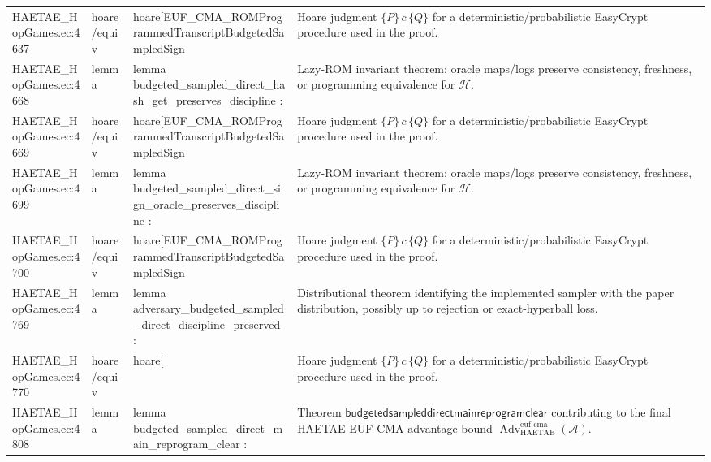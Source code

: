 \documentclass[10pt]{article}
\newcommand{\Adv}{\operatorname{Adv}}
\begin{document}
\begin{longtable}{L{0.11\textwidth}L{0.055\textwidth}L{0.385\textwidth}L{0.41\textwidth}}
HAETAE\_\allowbreak{}HopGames.\allowbreak{}ec:\allowbreak{}4637 & hoare/equiv & {\ttfamily\scriptsize hoare[EUF\_\allowbreak{}CMA\_\allowbreak{}ROMProgrammedTranscriptBudgetedSampledSign} & Hoare judgment $\{P\}\,c\,\{Q\}$ for a deterministic/probabilistic EasyCrypt procedure used in the proof. \\
HAETAE\_\allowbreak{}HopGames.\allowbreak{}ec:\allowbreak{}4668 & lemma & {\ttfamily\scriptsize lemma budgeted\_\allowbreak{}sampled\_\allowbreak{}direct\_\allowbreak{}hash\_\allowbreak{}get\_\allowbreak{}preserves\_\allowbreak{}discipline :} & Lazy-ROM invariant theorem: oracle maps/logs preserve consistency, freshness, or programming equivalence for $\mathcal H$. \\
HAETAE\_\allowbreak{}HopGames.\allowbreak{}ec:\allowbreak{}4669 & hoare/equiv & {\ttfamily\scriptsize hoare[EUF\_\allowbreak{}CMA\_\allowbreak{}ROMProgrammedTranscriptBudgetedSampledSign} & Hoare judgment $\{P\}\,c\,\{Q\}$ for a deterministic/probabilistic EasyCrypt procedure used in the proof. \\
HAETAE\_\allowbreak{}HopGames.\allowbreak{}ec:\allowbreak{}4699 & lemma & {\ttfamily\scriptsize lemma budgeted\_\allowbreak{}sampled\_\allowbreak{}direct\_\allowbreak{}sign\_\allowbreak{}oracle\_\allowbreak{}preserves\_\allowbreak{}discipline :} & Lazy-ROM invariant theorem: oracle maps/logs preserve consistency, freshness, or programming equivalence for $\mathcal H$. \\
HAETAE\_\allowbreak{}HopGames.\allowbreak{}ec:\allowbreak{}4700 & hoare/equiv & {\ttfamily\scriptsize hoare[EUF\_\allowbreak{}CMA\_\allowbreak{}ROMProgrammedTranscriptBudgetedSampledSign} & Hoare judgment $\{P\}\,c\,\{Q\}$ for a deterministic/probabilistic EasyCrypt procedure used in the proof. \\
HAETAE\_\allowbreak{}HopGames.\allowbreak{}ec:\allowbreak{}4769 & lemma & {\ttfamily\scriptsize lemma adversary\_\allowbreak{}budgeted\_\allowbreak{}sampled\_\allowbreak{}direct\_\allowbreak{}discipline\_\allowbreak{}preserved :} & Distributional theorem identifying the implemented sampler with the paper distribution, possibly up to rejection or exact-hyperball loss. \\
HAETAE\_\allowbreak{}HopGames.\allowbreak{}ec:\allowbreak{}4770 & hoare/equiv & {\ttfamily\scriptsize hoare[} & Hoare judgment $\{P\}\,c\,\{Q\}$ for a deterministic/probabilistic EasyCrypt procedure used in the proof. \\
HAETAE\_\allowbreak{}HopGames.\allowbreak{}ec:\allowbreak{}4808 & lemma & {\ttfamily\scriptsize lemma budgeted\_\allowbreak{}sampled\_\allowbreak{}direct\_\allowbreak{}main\_\allowbreak{}reprogram\_\allowbreak{}clear :} & Theorem $\mathsf{budgetedsampleddirectmainreprogramclear}$ contributing to the final HAETAE EUF-CMA advantage bound $\Adv_{\mathrm{HAETAE}}^{\mathrm{euf\mbox{-}cma}}(\mathcal A)$. \\

\end{longtable}
\end{document}
